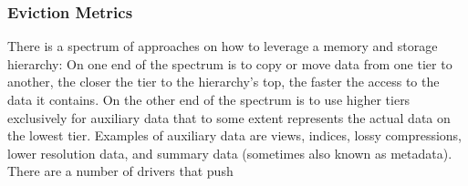 \subsubsection{Eviction Metrics}


There is a spectrum of approaches on how to leverage a memory and storage hierarchy: On one end of the spectrum is to copy or move data from one tier to another, the closer the tier to the hierarchy's top, the faster the access to the data it contains. On the other end of the spectrum is to use higher tiers exclusively for auxiliary data that to some extent represents the actual data on the lowest tier. Examples of auxiliary data are views, indices, lossy compressions, lower resolution data, and summary data (sometimes also known as metadata). There are a number of drivers that push 